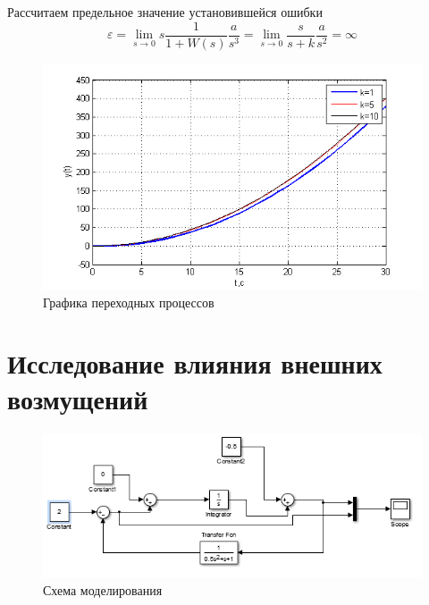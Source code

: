\documentclass[a4paper, 11pt]{article}
\begin{document}
Рассчитаем предельное значение установившейся ошибки
\[\varepsilon  = \mathop {\lim }\limits_{s \to 0} s\frac{1}{{1 + W(s)}}\frac{a}{{{s^3}}} = \mathop {\lim }\limits_{s \to 0} \frac{s}{{s + k}}\frac{a}{{{s^2}}} = \infty \]

\begin{center}
	\begin{figure}[h]
		\centering
		\includegraphics[width=0.7\linewidth]{8}
		\caption{Графика переходных процессов }
		\label{fig:8}
	\end{figure}
\end{center}

\section{Исследование влияния внешних возмущений}

\begin{figure}[h]
	\centering
	\includegraphics[width=0.7\linewidth]{9}
	\caption{Схема моделирования}
	\label{fig:9}
\end{figure}
\end{document}
